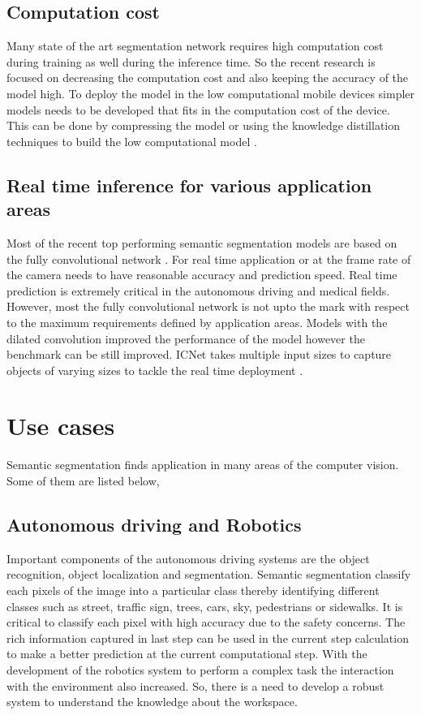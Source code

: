     \subsection{Computation cost}
    
    Many state of the art segmentation network requires high computation cost during training as well during the inference time. So the recent research is focused on decreasing the computation cost and also keeping the accuracy of the model high. To deploy the model in the low computational mobile devices simpler models needs to be developed that fits in the computation cost of the device. This can be done by compressing the model or using the knowledge distillation techniques to build the low computational model \cite{25_minaee2021image}. 
    
    \subsection{Real time inference for various application areas}
	
	Most of the recent top performing semantic segmentation models are based on the fully convolutional network \cite{31_chen2014semantic}. For real time application or at the frame rate of the camera needs to have reasonable accuracy and prediction speed. Real time prediction is extremely critical in the autonomous driving and medical fields. However, most the fully convolutional network is not upto the mark with respect to the maximum requirements defined by application areas. Models with the dilated convolution improved the performance of the model however the benchmark can be still improved. ICNet takes multiple input sizes to capture objects of varying sizes to tackle the real time deployment \cite{32_zhao2018icnet}.       

	\section{Use cases}
	
	Semantic segmentation finds application in many areas of the computer vision. Some of them are listed below,
	\subsection{Autonomous driving and Robotics}
	
	Important components of the autonomous driving systems are the object recognition, object localization and segmentation. Semantic segmentation classify each pixels of the image into a particular class thereby identifying different classes such as street, traffic sign, trees, cars, sky, pedestrians or sidewalks. It is critical to classify each pixel with high accuracy due to the safety concerns. The rich information captured in last step can be used in the current step calculation to make a better prediction at the current computational step. With the development of the robotics system to perform a complex task the interaction with the environment also increased. So, there is a need to develop a robust system to understand the knowledge about the workspace. 
	 
